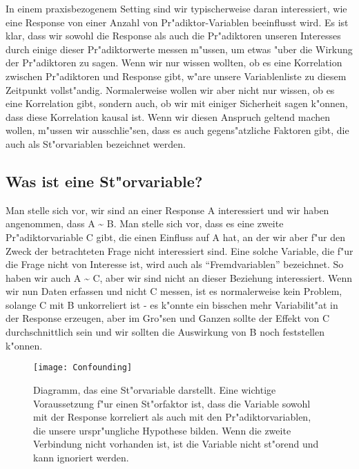 \documentclass[a4paper,twoside]{tufte-book}\usepackage[]{graphicx}\usepackage[]{color}
\begin{document}
In einem praxisbezogenem Setting sind wir typischerweise daran interessiert, wie eine Response von einer Anzahl von Pr"adiktor-Variablen beeinflusst wird. Es ist klar, dass wir sowohl die Response als auch die Pr"adiktoren unseren Interesses durch einige dieser Pr"adiktorwerte messen m"ussen, um etwas "uber die Wirkung der Pr"adiktoren zu sagen. Wenn wir nur wissen wollten, ob es eine Korrelation zwischen Pr"adiktoren und Response gibt, w"are unsere Variablenliste zu diesem Zeitpunkt vollst"andig. Normalerweise wollen wir aber nicht nur wissen, ob es eine Korrelation gibt, sondern auch, ob wir mit einiger Sicherheit sagen k"onnen, dass diese Korrelation kausal ist. Wenn wir diesen Anspruch geltend machen wollen, m"ussen wir ausschlie"sen, dass es auch gegens"atzliche Faktoren gibt, die auch als St"orvariablen bezeichnet werden.

\subsection{Was ist eine St"orvariable?}

Man stelle sich vor, wir sind an einer Response A interessiert und wir haben angenommen, dass A \~{} B. Man stelle sich vor, dass es eine zweite Pr"adiktorvariable C gibt, die einen Einfluss auf A hat, an der wir aber f"ur den Zweck der betrachteten Frage nicht interessiert sind. Eine solche Variable, die f"ur die Frage nicht von Interesse ist, wird auch als "`Fremdvariablen"' bezeichnet. So haben wir auch A \~{} C, aber wir sind nicht an dieser Beziehung interessiert. Wenn wir nun Daten erfassen und nicht C messen, ist es normalerweise kein Problem, solange C mit B unkorreliert ist - es k"onnte ein bisschen mehr Variabilit"at in der Response erzeugen, aber im Gro"sen und Ganzen sollte der Effekt von C durchschnittlich sein und wir sollten die Auswirkung von B noch feststellen k"onnen.

\begin{figure}[]
\begin{center}
\texttt{[image: Confounding]}
\caption{Diagramm, das eine St"orvariable darstellt. Eine wichtige Voraussetzung f"ur einen St"orfaktor ist, dass die Variable sowohl mit der Response korreliert als auch mit den Pr"adiktorvariablen, die unsere urspr"ungliche Hypothese bilden. Wenn die zweite Verbindung nicht vorhanden ist, ist die Variable nicht st"orend und kann ignoriert werden.}
\label{fig: Confounding}
\end{center}
\end{figure}
\end{document}
